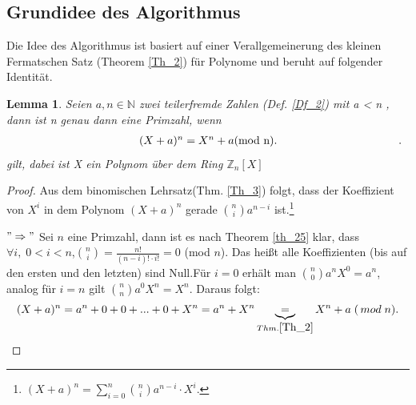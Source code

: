 \documentclass[12pt,oneside]{article}
\newtheorem{lemma}[theorem]{Lemma}
\theoremstyle{remark}
\theoremstyle{definition}
\begin{document}
\subsection{Grundidee des Algorithmus}
Die Idee des Algorithmus ist basiert auf einer Verallgemeinerung des kleinen Fermatschen Satz (Theorem \ref{Th_2}) für Polynome und beruht auf folgender Identität.
\begin{flushleft}
\begin{lemma}\label{hauptlemma}
Seien $a,n \in \mathbb{N}$ zwei teilerfremde Zahlen (Def. \ref{Df_2}) mit a < n , dann ist n genau dann eine Primzahl, wenn \newline
\begin{align*}\label{eq:1}
\centerline{ $(X + a)^n = X^n +a $(mod n).}.
\end{align*}\newline
gilt, dabei ist X ein Polynom über dem Ring $\mathbb{Z}_{n}[X]$
\end{lemma}
\begin{proof}
Aus dem binomischen Lehrsatz(Thm. \ref{Th_3}) folgt, dass der Koeffizient von $X^i$ in dem Polynom $(X + a)^n$ gerade ${n \choose i} a^{n-i}$ ist.\footnote{$(X + a)^n = \sum_{i = 0}^{n}{n \choose i} a^{n - i} \cdot
X^i$.}\newline\newline

$"\Rightarrow"$\newline
Sei $n$ eine Primzahl, dann ist es nach Theorem \ref{th_25} klar, dass $\forall i , \;  0 < i < n$,\newline\smallskip ${n \choose i} = \frac{n!}{(n-i)! \cdot i!} = 0 $ (mod $n$). Das heißt alle Koeffizienten (bis auf den ersten und den letzten) sind Null.\newline\newline Für $i = 0$ erhält man  ${n \choose 0} a^n X^0 = a^n$, analog für $i = n$ gilt ${n \choose n} a^0 X^n = X^n$. Daraus folgt:
\begin{align*}
    (X + a)^n = a^n + 0 + 0 + ... + 0 + X^n = a^n + X^n \underbrace{=}_{Thm. \ref{Th_2}} X^n + a \; ( \, mod \; n).
\end{align*}


\end{proof}
\end{flushleft}
\end{document}
